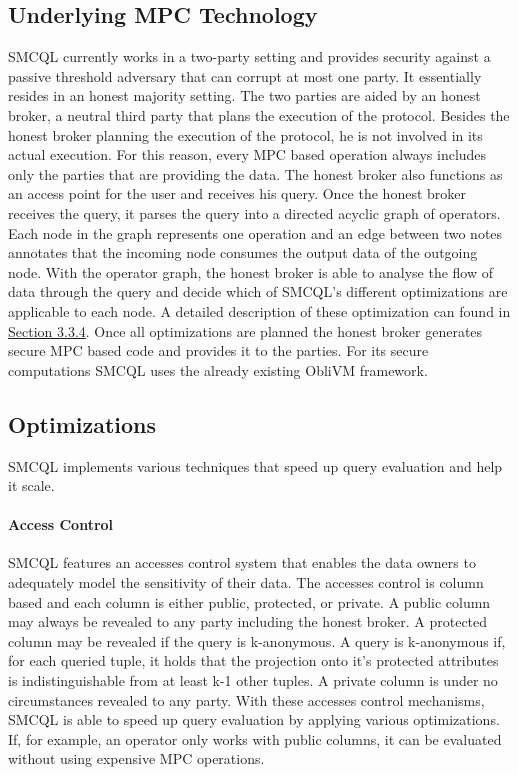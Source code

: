 \subsection{Underlying MPC Technology}
SMCQL currently works in a two-party setting and provides security against a passive threshold adversary that can corrupt at most one party.  It essentially resides in an honest majority setting. The two parties are aided by an honest broker, a neutral third party that plans the execution of the protocol. Besides the honest broker planning the execution of the protocol, he is not involved in its actual execution. For this reason, every MPC based operation always includes only the parties that are providing the data.
The honest broker also functions as an access point for the user and receives his query. 
Once the honest broker receives the query, it parses the query into a directed acyclic graph of operators. Each node in the graph represents one operation and an edge between two notes annotates that the incoming node consumes the output data of the outgoing node. With the operator graph, the honest broker is able to analyse the flow of data through the query and decide which of SMCQL's different optimizations are applicable to each node. 
A detailed description of these optimization can found in \hyperref[sec:Optimizations_smcql]{Section 3.3.4}. Once all optimizations are planned the honest broker generates secure MPC based code and provides it to the parties. For its secure computations SMCQL uses the already existing ObliVM framework.

	




\subsection{Optimizations}
\label{sec:Optimizations_smcql}
SMCQL implements various techniques that speed up query evaluation and help it scale. 
\label{Accesses_label}
\paragraph{Access Control}
SMCQL features an accesses control system that enables the data owners to adequately model the sensitivity of their data. 
The accesses control is column based and each column is either public, protected, or private. 
A public column may always be revealed to any party including the honest broker. A protected column may be revealed if the query is k-anonymous. A query is k-anonymous if, for each queried tuple, it holds that the projection onto it's protected attributes is indistinguishable from at least k-1 other tuples. A private column is under no circumstances revealed to any party. With these accesses control mechanisms, SMCQL is able to speed up query evaluation by applying various optimizations. If, for example, an operator only works with public columns, it can be evaluated without using expensive MPC operations.
